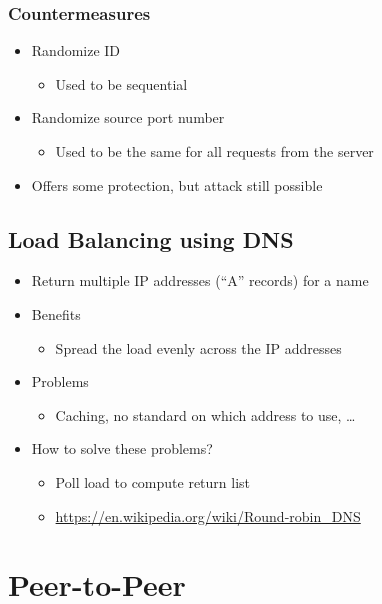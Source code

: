 \subsubsection{Countermeasures}
\begin{itemize}[nosep]
    \item Randomize ID
          \begin{itemize}[nosep]
              \item Used to be sequential
          \end{itemize}
    \item Randomize source port number
          \begin{itemize}[nosep]
              \item Used to be the same for all requests from the server
          \end{itemize}
    \item Offers some protection, but attack still possible
\end{itemize}
\subsection{Load Balancing using DNS}
\begin{itemize}[nosep]
    \item Return multiple IP addresses (``A'' records) for a name
    \item Benefits
          \begin{itemize}[nosep]
              \item Spread the load evenly across the IP addresses
          \end{itemize}
    \item Problems
          \begin{itemize}[nosep]
              \item Caching, no standard on which address to use, \dots
          \end{itemize}
    \item How to solve these problems?
          \begin{itemize}[nosep]
              \item Poll load to compute return list
              \item \url{https://en.wikipedia.org/wiki/Round-robin_DNS}
          \end{itemize}
\end{itemize}
\section{Peer-to-Peer}
